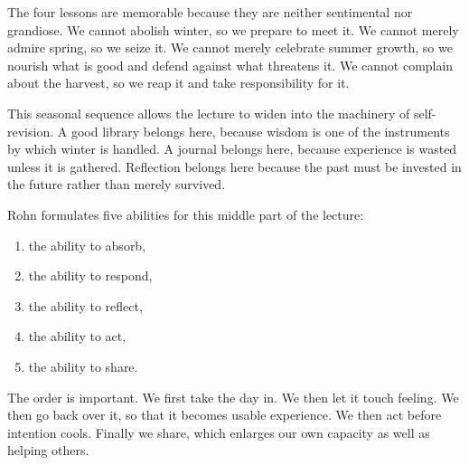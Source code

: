 \begin{figure}
\begin{center}
\end{center}
\end{figure}

The four lessons are memorable because they are neither sentimental nor grandiose. We cannot abolish winter, so we prepare to meet it. We cannot merely admire spring, so we seize it. We cannot merely celebrate summer growth, so we nourish what is good and defend against what threatens it. We cannot complain about the harvest, so we reap it and take responsibility for it.

This seasonal sequence allows the lecture to widen into the machinery of self-revision. A good library belongs here, because wisdom is one of the instruments by which winter is handled. A journal belongs here, because experience is wasted unless it is gathered. Reflection belongs here because the past must be invested in the future rather than merely survived.

Rohn formulates five abilities for this middle part of the lecture:
\begin{enumerate}
\item the ability to absorb,
\item the ability to respond,
\item the ability to reflect,
\item the ability to act,
\item the ability to share.
\end{enumerate}
The order is important. We first take the day in. We then let it touch feeling. We then go back over it, so that it becomes usable experience. We then act before intention cools. Finally we share, which enlarges our own capacity as well as helping others.

